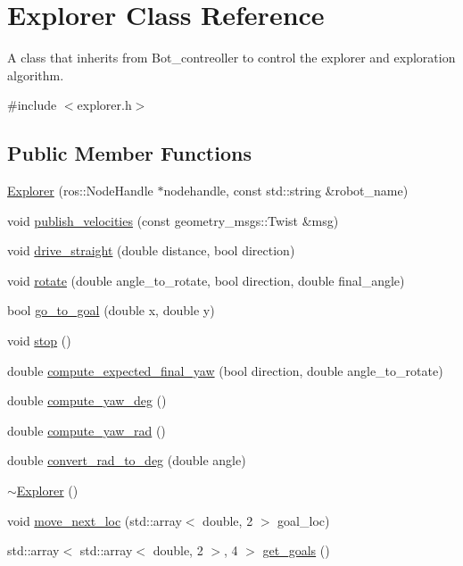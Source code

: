 \hypertarget{class_explorer}{}\section{Explorer Class Reference}
\label{class_explorer}


A class that inherits from Bot\+\_\+contreoller to control the explorer and exploration algorithm.  




{\ttfamily \#include $<$explorer.\+h$>$}

\subsection*{Public Member Functions}
\begin{DoxyCompactItemize}
\item 
\hyperlink{class_explorer_aafe6b7c3b9c2e24815aa14a731f31890}{Explorer} (ros\+::\+Node\+Handle $\ast$nodehandle, const std\+::string \&robot\+\_\+name)
\item 
void \hyperlink{class_explorer_a8ffef25585ef957b9df4407366723787}{publish\+\_\+velocities} (const geometry\+\_\+msgs\+::\+Twist \&msg)
\item 
void \hyperlink{class_explorer_ab4ca9f16c48a60fc4d0e426b6fd9e9a0}{drive\+\_\+straight} (double distance, bool direction)
\item 
void \hyperlink{class_explorer_ac8e3a980fd3929734fb3a4b0b2e0a7e0}{rotate} (double angle\+\_\+to\+\_\+rotate, bool direction, double final\+\_\+angle)
\item 
bool \hyperlink{class_explorer_aa1e259feaac1114adb0f24588428e8ef}{go\+\_\+to\+\_\+goal} (double x, double y)
\item 
void \hyperlink{class_explorer_a0e4a623ff30d1886cc9f57ec081c527f}{stop} ()
\item 
double \hyperlink{class_explorer_a02c37b93448ed474f1bf0d03e2758ca2}{compute\+\_\+expected\+\_\+final\+\_\+yaw} (bool direction, double angle\+\_\+to\+\_\+rotate)
\item 
double \hyperlink{class_explorer_a670cdffdb8c3173c300590cfc45ab6d2}{compute\+\_\+yaw\+\_\+deg} ()
\item 
double \hyperlink{class_explorer_ac5b91cd64189a60ffe62535cb5bc093a}{compute\+\_\+yaw\+\_\+rad} ()
\item 
double \hyperlink{class_explorer_ac3a5c9368647dd9d2c36d12497bd889e}{convert\+\_\+rad\+\_\+to\+\_\+deg} (double angle)
\item 
\hyperlink{class_explorer_aa1b0a71e92e003e9162a5ba99d843392}{$\sim$\+Explorer} ()
\item 
void \hyperlink{class_explorer_a2b0c1e46e1a17e99f4156edf5a93b691}{move\+\_\+next\+\_\+loc} (std\+::array$<$ double, 2 $>$ goal\+\_\+loc)
\item 
std\+::array$<$ std\+::array$<$ double, 2 $>$, 4 $>$ \hyperlink{class_explorer_a847e3ad2e7233d493a8dcfdd7139cb58}{get\+\_\+goals} ()
\end{DoxyCompactItemize}
